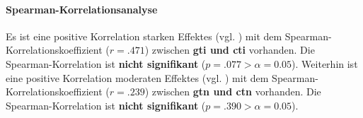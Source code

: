 \documentclass[a4paper,11pt]{article}%
\renewcommand{\\}{\vspace*{0.5\baselineskip} \newline}
\begin{document}
\paragraph{Spearman-Korrelationsanalyse}
Es ist eine positive Korrelation starken Effektes (vgl. \cite{cohen2013statistical}) mit dem Spearman-Korrelationskoeffizient ($r = .471$) zwischen \textbf{\ac{gti} und \ac{cti}} vorhanden. Die Spearman-Korrelation ist \textbf{nicht signifikant} ($p = .077 > \alpha = 0.05$).\\
Weiterhin ist eine positive Korrelation moderaten Effektes (vgl. \cite{cohen2013statistical}) mit dem Spearman-Korrelationskoeffizient ($r = .239$) zwischen \textbf{\ac{gtn} und \ac{ctn}} vorhanden. Die Spearman-Korrelation ist \textbf{nicht signifikant} ($p = .390 > \alpha = 0.05$).



%
%	
\end{document}
